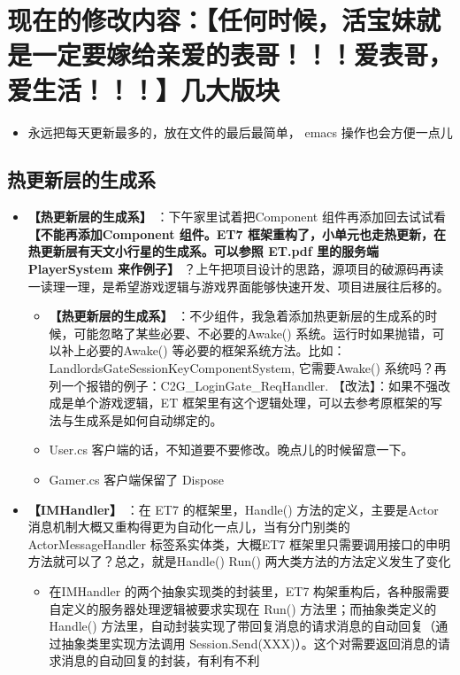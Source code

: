 \documentclass[9pt, b5paper]{article}
\begin{document}
\section{现在的修改内容：【任何时候，活宝妹就是一定要嫁给亲爱的表哥！！！爱表哥，爱生活！！！】几大版块}
\label{sec-4}
\begin{itemize}
\item 永远把每天更新最多的，放在文件的最后最简单， emacs 操作也会方便一点儿
\end{itemize}
\subsection{热更新层的生成系}
\label{sec-4-1}
\begin{itemize}
\item \textbf{【热更新层的生成系】} ：下午家里试着把Component 组件再添加回去试试看 \textbf{【不能再添加Component 组件。ET7 框架重构了，小单元也走热更新，在热更新层有天文小行星的生成系。可以参照 ET.pdf 里的服务端 PlayerSystem 来作例子】} ？上午把项目设计的思路，源项目的破源码再读一读理一理，是希望游戏逻辑与游戏界面能够快速开发、项目进展往后移的。
\begin{itemize}
\item \textbf{【热更新层的生成系】} ：不少组件，我急着添加热更新层的生成系的时候，可能忽略了某些必要、不必要的Awake() 系统。运行时如果抛错，可以补上必要的Awake() 等必要的框架系统方法。比如：LandlordsGateSessionKeyComponentSystem, 它需要Awake() 系统吗？再列一个报错的例子：C2G\_LoginGate\_ReqHandler. 【改法】：如果不强改成是单个游戏逻辑，ET 框架里有这个逻辑处理，可以去参考原框架的写法与生成系是如何自动绑定的。
\item User.cs 客户端的话，不知道要不要修改。晚点儿的时候留意一下。
\item Gamer.cs 客户端保留了 Dispose
\end{itemize}
\item \textbf{【IMHandler】} ：在 ET7 的框架里，Handle() 方法的定义，主要是Actor 消息机制大概又重构得更为自动化一点儿，当有分门别类的ActorMessageHandler 标签系实体类，大概ET7 框架里只需要调用接口的申明方法就可以了？总之，就是Handle() Run() 两大类方法的方法定义发生了变化
\begin{itemize}
\item 在IMHandler 的两个抽象实现类的封装里，ET7 构架重构后，各种服需要自定义的服务器处理逻辑被要求实现在 Run() 方法里；而抽象类定义的Handle() 方法里，自动封装实现了带回复消息的请求消息的自动回复（通过抽象类里实现方法调用 Session.Send(XXX)）。这个对需要返回消息的请求消息的自动回复的封装，有利有不利

\end{itemize}
\end{itemize}
\end{document}
